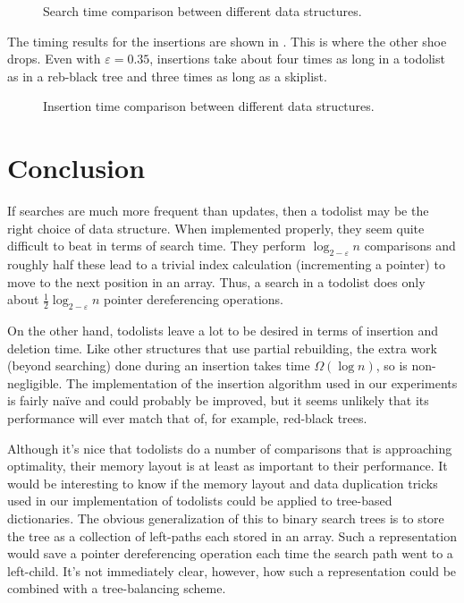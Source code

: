 \documentclass[12pt]{patmorin}
\newcommand{\eps}{\varepsilon}
\begin{document}
\begin{figure}
  \centering{}
  \caption{Search time comparison between different data structures.}
\end{figure}

The timing results for the insertions are shown in
. This is where the other shoe drops.  Even with
$\eps=0.35$, insertions take about four times as long in a todolist as
in a reb-black tree and three times as long as a skiplist.  

\begin{figure}
  \centering{}
  \caption{Insertion time comparison between different data structures.}
\end{figure}



\section{Conclusion}

If searches are much more frequent than updates, then a todolist may
be the right choice of data structure.  When implemented properly,
they seem quite difficult to beat in terms of search time.  They
perform $\log_{2-\eps} n$ comparisons and roughly half these lead to
a trivial index calculation (incrementing a pointer) to move to the
next position in an array. Thus, a search in a todolist does only about
$\frac{1}{2}\log_{2-\eps} n$ pointer dereferencing operations.

On the other hand, todolists leave a lot to be desired in terms of
insertion and deletion time.  Like other structures that use partial
rebuilding, the extra work (beyond searching) done during an insertion
takes time $\Omega(\log n)$, so is non-negligible.  The implementation
of the insertion algorithm used in our experiments is fairly naïve and
could probably be improved, but it seems unlikely that its performance
will ever match that of, for example, red-black trees.

Although it's nice that todolists do a number of comparisons that is
approaching optimality, their memory layout is at least as important to
their performance.  It would be interesting to know if the memory layout
and data duplication tricks used in our implementation of todolists could
be applied to tree-based dictionaries.  The obvious generalization of this
to binary search trees is to store the tree as a collection of left-paths
each stored in an array. Such a representation would save a pointer
dereferencing operation each time the search path went to a left-child.
It's not immediately clear, however, how such a representation could be
combined with a tree-balancing scheme.



\end{document}
